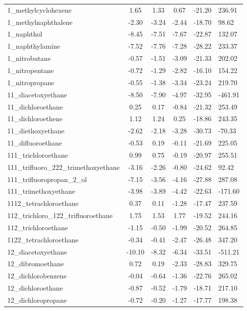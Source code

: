 \documentclass{amsart}
\begin{document}
\begin{longtable}{L|C|C|C|X|X}
1\_methylcyclohexene & 1.65 & 1.33 & 0.67 & -21.20 & 236.91 \\ 
1\_methylnaphthalene & -2.30 & -3.24 & -2.44 & -18.70 & 98.62 \\ 
1\_naphthol & -8.45 & -7.51 & -7.67 & -22.87 & 132.07 \\ 
1\_naphthylamine & -7.52 & -7.76 & -7.28 & -28.22 & 233.37 \\ 
1\_nitrobutane & -0.57 & -1.51 & -3.09 & -21.33 & 202.02 \\ 
1\_nitropentane & -0.72 & -1.29 & -2.82 & -16.10 & 154.22 \\ 
1\_nitropropane & -0.55 & -1.38 & -3.34 & -23.24 & 219.70 \\ 
11\_diacetoxyethane & -8.50 & -7.90 & -4.97 & -32.95 & -461.91 \\ 
11\_dichloroethane & 0.25 & 0.17 & -0.84 & -21.32 & 253.49 \\ 
11\_dichloroethene & 1.12 & 1.24 & 0.25 & -18.86 & 243.35 \\ 
11\_diethoxyethane & -2.62 & -2.18 & -3.28 & -30.73 & -70.33 \\ 
11\_difluoroethane & -0.53 & 0.19 & -0.11 & -21.69 & 225.05 \\ 
111\_trichloroethane & 0.99 & 0.75 & -0.19 & -20.97 & 255.51 \\ 
111\_trifluoro\_222\_trimethoxyethane & -3.16 & -2.26 & -0.80 & -24.62 & 92.42 \\ 
111\_trifluoropropan\_2\_ol & -7.15 & -3.56 & -4.16 & -27.88 & 287.08 \\ 
111\_trimethoxyethane & -3.98 & -3.89 & -4.42 & -22.63 & -171.60 \\ 
1112\_tetrachloroethane & 0.37 & 0.11 & -1.28 & -17.47 & 237.59 \\ 
112\_trichloro\_122\_trifluoroethane & 1.75 & 1.53 & 1.77 & -19.52 & 244.16 \\ 
112\_trichloroethane & -1.15 & -0.50 & -1.99 & -20.52 & 264.85 \\ 
1122\_tetrachloroethane & -0.34 & -0.41 & -2.47 & -26.48 & 347.20 \\ 
12\_diacetoxyethane & -10.10 & -8.32 & -6.34 & -33.51 & -511.21 \\ 
12\_dibromoethane & 0.72 & 0.19 & -2.33 & -28.83 & 329.75 \\ 
12\_dichlorobenzene & -0.04 & -0.64 & -1.36 & -22.76 & 265.02 \\ 
12\_dichloroethane & -0.87 & -0.52 & -1.79 & -18.71 & 217.10 \\ 
12\_dichloropropane & -0.72 & -0.20 & -1.27 & -17.77 & 198.38 \\ 

\end{longtable}
\end{document}
